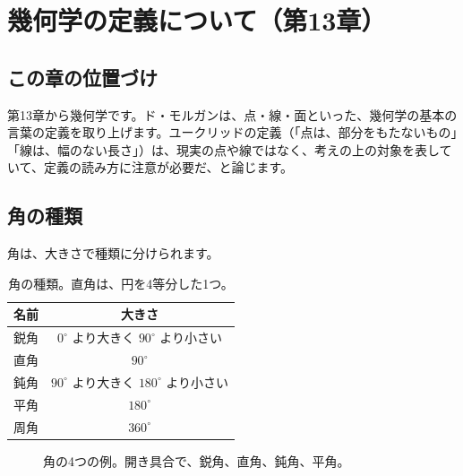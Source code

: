 \documentclass[a4paper,11pt,openany]{ltjsbook}
\begin{document}
\chapter{幾何学の定義について（第13章）}

\section{この章の位置づけ}

第13章から幾何学です。ド・モルガンは、点・線・面といった、幾何学の基本の言葉の定義を取り上げます。ユークリッドの定義（「点は、部分をもたないもの」「線は、幅のない長さ」）は、現実の点や線ではなく、考えの上の対象を表していて、定義の読み方に注意が必要だ、と論じます。

\section{角の種類}

角は、大きさで種類に分けられます。

\begin{table}[htbp]
\centering
\begin{tabular}{lc}
\toprule
名前 & 大きさ\\
\midrule
鋭角 & $0^\circ$ より大きく $90^\circ$ より小さい\\
直角 & $90^\circ$\\
鈍角 & $90^\circ$ より大きく $180^\circ$ より小さい\\
平角 & $180^\circ$\\
周角 & $360^\circ$\\
\bottomrule
\end{tabular}
\caption{角の種類。直角は、円を4等分した1つ。}
\end{table}

\begin{figure}[htbp]
\centering
{}
\caption{角の4つの例。開き具合で、鋭角、直角、鈍角、平角。}
\end{figure}
\end{document}
